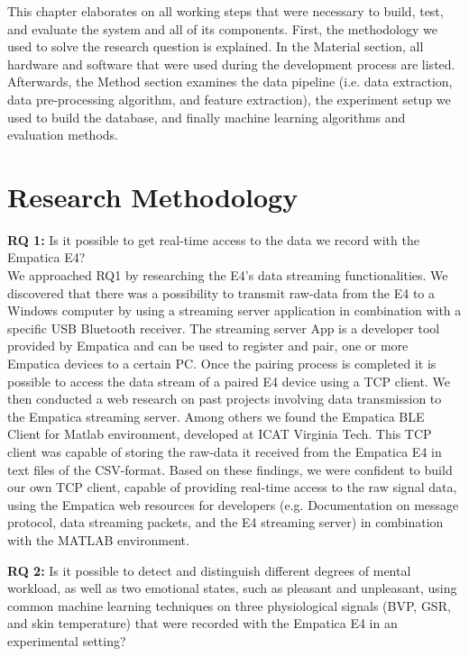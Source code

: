 This chapter elaborates on all working steps that were necessary to build, test, and evaluate the system and all of its components. First, the methodology we used to solve the research question is explained. In the Material section, all hardware and software that were used during the development process are listed. Afterwards, the Method section examines the data pipeline (i.e. data extraction, data pre-processing algorithm, and feature extraction), the experiment setup we used to build the database, and finally machine learning algorithms and evaluation methods.
\section{Research Methodology}
\textbf{RQ 1:} Is it possible to get real-time access to the data we record with the Empatica E4?\\[10pt]
We approached RQ1 by researching the E4's data streaming functionalities. We discovered that there was a possibility to transmit raw-data from the E4 to a Windows computer by using a streaming server application in combination with a specific USB Bluetooth receiver. The streaming server App is a developer tool provided by Empatica and can be used to register and pair, one or more Empatica devices to a certain PC. Once the pairing process is completed it is possible to access the data stream of a paired E4 device using a TCP client. We then conducted a web research on past projects involving data transmission to the Empatica streaming server. Among others we found the Empatica BLE Client for Matlab environment, developed at ICAT Virginia Tech. This TCP client was capable of storing the raw-data it received from the Empatica E4 in text files of the CSV-format. Based on these findings, we were confident to build our own TCP client, capable of providing real-time access to the raw signal data, using the Empatica web resources for developers (e.g. Documentation on message protocol, data streaming packets, and the E4 streaming server) in combination with the MATLAB environment. 
 
\textbf{RQ 2:} Is it possible to detect and distinguish different degrees of mental workload, as well as two emotional states, such as pleasant and unpleasant, using common machine learning techniques on three physiological signals (BVP, GSR, and skin temperature) that were recorded with the Empatica E4 in an experimental setting?\\[10pt]

